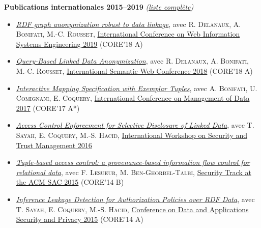 \documentclass[12pt,a4paper]{article}
\newcommand{\activite}[1]{\textbf{#1}\xspace}
\newcommand{\comment}[1]{\textsl{#1}\xspace}
\begin{document}
\activite{Publications internationales 2015--2019} \comment{(\href{{https://dblp.org/pers/hd/t/Thion:Romuald}}{liste complète})}
  \begin{itemize}
    \item \href{https://hal.archives-ouvertes.fr/hal-02444752}{\emph{RDF graph anonymization robust to data linkage}}, avec \textsc{R. Delanaux, A. Bonifati, M.-C. Rousset}, 
    \href{https://wise2019.comp.polyu.edu.hk/}{International Conference on Web Information Systems Engineering 2019} (CORE'18 A)    
  
    \item \href{https://hal.archives-ouvertes.fr/hal-01896276/}{\emph{Query-Based Linked Data Anonymization}}, avec \textsc{R. Delanaux, A. Bonifati, M.-C. Rousset},
          \href{http://iswc2018.semanticweb.org/}{International Semantic Web Conference 2018} (CORE'18 A)

    \item \href{https://hal.archives-ouvertes.fr/hal-01548855/}{\emph{Interactive Mapping Specification with Exemplar Tuples}}, avec \textsc{A. Bonifati, U. Comignani, E. Coquery},
          \href{https://sigmod2017.org/}{International Conference on Management of Data 2017} (CORE'17 A*)
          
    \item \href{https://hal.archives-ouvertes.fr/hal-01371530}{\emph{Access Control Enforcement for Selective Disclosure of Linked Data}}, avec \textsc{T. Sayah, E. Coquery, M.-S. Hacid}, 
\href{http://stm2016.ics.forth.gr/}{International Workshop on Security and Trust Management 2016}
 
    \item \href{https://hal.archives-ouvertes.fr/hal-01192900v1}{\emph{Tuple-based access control: a provenance-based information flow control for relational data}}, avec \textsc{F. Lesueur, M. Ben-Ghorbel-Talbi},
 \href{http://www.sigapp.org/sac/sac2015/}{Security Track at the ACM SAC 2015} (CORE'14 B)
 

    \item \href{https://hal.inria.fr/hal-01745813}{\emph{Inference Leakage Detection for Authorization Policies over RDF Data}}, avec \textsc{T. Sayah, E. Coquery, M.-S. Hacid}, 
 \href{http://dbsec2015.di.unimi.it/}{Conference on Data and Applications Security and Privacy 2015} (CORE'14 A)
  \end{itemize}
\end{document}
